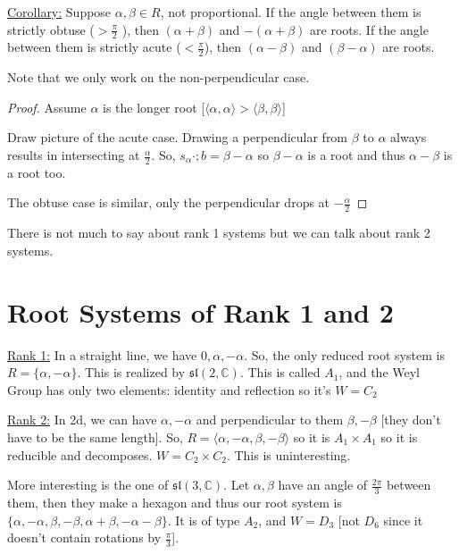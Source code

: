 \documentclass{article}
\theoremstyle{definition}
\begin{document}
\underline{Corollary:} Suppose \(\alpha ,\beta \in R\), not proportional. If the angle between them is strictly obtuse (\(> \frac{\pi}{2}\) ), then \((\alpha + \beta )\) and \(-(\alpha +\beta )\) are roots. If the angle between them is strictly acute (\(<\frac{\pi}{2}\)), then \((\alpha-\beta)\) and \((\beta -\alpha )\) are roots.

Note that we only work on the non-perpendicular case.

\begin{proof}
    Assume \(\alpha \) is the longer root [\(\langle \alpha ,\alpha  \rangle > \langle \beta ,\beta  \rangle \)]

    Draw picture of the acute case. Drawing a perpendicular from \(\beta \) to \(\alpha\) always results in intersecting at \(\frac{\alpha}{2}\). So, \(s_\alpha\cdot;b = \beta - \alpha\) so \(\beta -\alpha \) is a root and thus \(\alpha - \beta \) is a root too.

    The obtuse case is similar, only the perpendicular drops at \(-\frac{\alpha}{2}\) 

\end{proof}

There is not much to say about rank 1 systems but we can talk about rank 2 systems.

\section*{Root Systems of Rank 1 and 2}

\underline{Rank 1:} In a straight line, we have \(0,\alpha ,-\alpha\). So, the only reduced root system is \(R = \{ \alpha ,-\alpha \} \). This is realized by \(\mathfrak{sl}(2,\mathbb{C})\). This is called \(A_1\), and the Weyl Group has only two elements: identity and reflection so it's \(W=C_2\)

\underline{Rank 2:} In 2d, we can have \(\alpha ,-\alpha \) and perpendicular to them \(\beta,-\beta\) [they don't have to be the same length]. So, \(R = \langle \alpha ,-\alpha ,\beta ,-\beta  \rangle \) so it is \(A_1\times A_1\) so it is reducible and decomposes. \(W=C_2\times C_2\). This is uninteresting.

More interesting is the one of \(\mathfrak{sl}(3,\mathbb{C})\). Let \(\alpha,\beta\) have an angle of \(\frac{2\pi}{3}\) between them, then they make a hexagon and thus our root system is \(\{ \alpha ,-\alpha ,\beta ,-\beta ,\alpha +\beta,-\alpha -\beta\} \). It is of type \(A_2\), and \(W=D_3\) [not \(D_6\) since it doesn't contain rotations by \(\frac{\pi}{3}\)].
\end{document}
